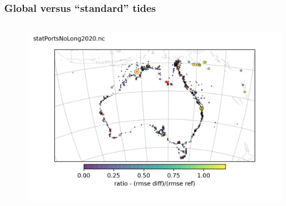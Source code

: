 \begin{frame}
\frametitle{Global versus ``standard'' tides}
\begin{columns}
    \begin{column}{0.7\textwidth}
      \begin{figure}      
        \includegraphics[width=\textwidth]{figures/maps/portsdiffRmseRatioNoLong.png}
      \end{figure}
    \end{column}


\end{columns}
\end{frame}
